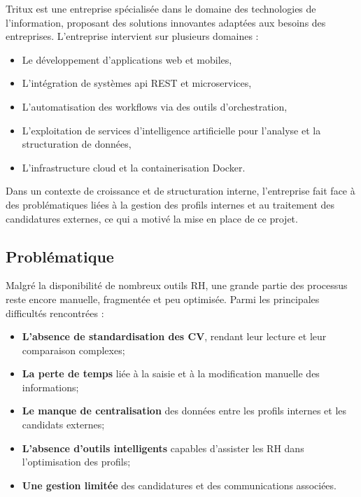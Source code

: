 Tritux est une entreprise spécialisée dans le domaine des technologies de l'information, proposant des solutions innovantes adaptées aux besoins des entreprises. L'entreprise intervient sur plusieurs domaines :

\begin{itemize}
    \item Le développement d'applications web et mobiles,
    \item L'intégration de systèmes \acrfull{api} REST et microservices,
    \item L'automatisation des workflows via des outils d'orchestration,
    \item L'exploitation de services d'intelligence artificielle pour l'analyse et la structuration de données,
    \item L'infrastructure cloud et la containerisation Docker.
\end{itemize}

Dans un contexte de croissance et de structuration interne, l'entreprise fait face à des problématiques liées à la gestion des profils internes et au traitement des candidatures externes, ce qui a motivé la mise en place de ce projet.


\subsection{Problématique}
\label{subsec:problematique}

Malgré la disponibilité de nombreux outils RH, une grande partie des processus reste encore manuelle, fragmentée et peu optimisée. Parmi les principales difficultés rencontrées :

\begin{itemize}
    \item \textbf{L'absence de standardisation des CV}, rendant leur lecture et leur comparaison complexes;
    
    \item \textbf{La perte de temps} liée à la saisie et à la modification manuelle des informations;
    
    \item \textbf{Le manque de centralisation} des données entre les profils internes et les candidats externes;
    
    \item \textbf{L'absence d'outils intelligents} capables d'assister les RH dans l'optimisation des profils;
    
    \item \textbf{Une gestion limitée} des candidatures et des communications associées.
\end{itemize}

